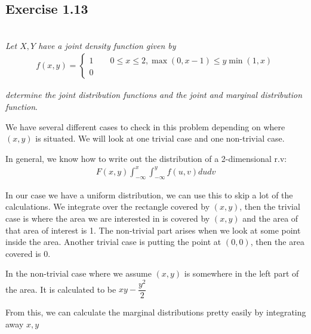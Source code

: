 \subsection{Exercise 1.13}\hfill\\
\textit{Let $X,Y$ have a joint density function given by}
\begin{equation*}
  \begin{gathered}
    f(x,y) = 
    \begin{cases*}
      1\qquad 0\leq x\leq2, \max(0,x-1)\leq y\min(1,x)\\
      0
    \end{cases*}
  \end{gathered}
\end{equation*}\par
\textit{determine the joint distribution functions and the joint and marginal distribution function}.
\par\bigskip
\noindent We have several different cases to check in this problem depending on where $(x,y)$ is situated. We will look at one trivial case and one non-trivial case.\par
In general, we know how to write out the distribution of a 2-dimensional r.v:
\begin{equation*}
  \begin{gathered}
    F(x,y)\int_{-\infty}^{x}\int_{-\infty}^{y}f(u,v)dudv
  \end{gathered}
\end{equation*}\par
\noindent In our case we have a uniform distribution, we can use this to skip a lot of the calculations. We integrate over the rectangle covered by $(x,y)$, then the trivial case is where the area we are interested in is covered by $(x,y)$ and the area of that area of interest is 1. The non-trivial part arises when we look at some point inside the area. Another trivial case is putting the point at $(0,0)$, then the area covered is 0.
\par\bigskip
In the non-trivial case where we assume $(x,y)$ is somewhere in the left part of the area. It is calculated to be  $xy-\dfrac{y^2}{2}$
\par\bigskip
From this, we can calculate the marginal distributions pretty easily by integrating away $x,y$
\par\bigskip
